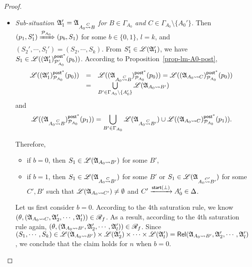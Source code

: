\begin{proof}
{\begin{itemize}
        \item \emph{Sub-situation ${\mathfrak{A} }'_1 = {\mathfrak{A} }_{A_0\stackrel{C}\rightsquigarrow B}$ for $B\in\Gamma_{A_0}$ and $C \in \Gamma_{A_0}\setminus\{A_0'\}$.}
    Then $(p_1,S_1') \xRightarrow{{\mathcal{P} }_{A_0}}(p_b, S_1)$ for some $b\in\{0,1\}$, $l=k$, and $(S_2',\cdots,S_l')=(S_2,\cdots,S_k)$. 
    From  $S'_1 \in {\mathscr{L} }({\mathfrak{A} }'_1)$, we have
    $S_1 \in {\mathscr{L} }(({\mathfrak{A} }_1')^{{\mathsf{post} }^*}_{{\mathcal{P} }'_{A_0}}(p_b))$. 
    According to Proposition~\ref{prop-lm-A0-post},  
    $$
    \begin{array}{l c l}
    {\mathscr{L} }(({\mathfrak{A} }_1')^{{\mathsf{post} }^*}_{{\mathcal{P} }_{A_0}}(p_0)) & = & {\mathscr{L} }(({\mathfrak{A} }_{A_0\stackrel{C}\rightsquigarrow B})^{{\mathsf{post} }^*}_{{\mathcal{P} }_{A_0}}(p_0)) ={\mathscr{L} }(({\mathfrak{A} }_{A_0 \rightsquigarrow C})^{{\mathsf{post} }^*}_{{\mathcal{P} }_{A_0}}(p_0)) \\
    & = & \bigcup\limits_{B' \in \Gamma_{A_0}\setminus\{A_0'\}} {\mathscr{L} }({\mathfrak{A} }_{A_0\rightsquigarrow B'})
    \end{array}
    $$ 
      and  
     $${\mathscr{L} }(({\mathfrak{A} }_{A_0\stackrel{C}\rightsquigarrow B})^{{\mathsf{post} }^*}_{{\mathcal{P} }_{A_0}}(p_1)) = 
    \bigcup\limits_{B'\in\Gamma_{A_0}} {\mathscr{L} }({\mathfrak{A} }_{A_0\stackrel{C}\rightsquigarrow B'}) \cup  {\mathscr{L} }(({\mathfrak{A} }_{A_0 \rightsquigarrow C})^{{\mathsf{post} }^*}_{{\mathcal{P} }_{A_0}}(p_1)).$$
 
 Therefore, 
 \begin{itemize}
	\item if $b = 0$, then  $S_1 \in {\mathscr{L} }({\mathfrak{A} }_{A_0\rightsquigarrow B'})$ for some $B'$,
	\item if $b = 1$, then $S_1 \in {\mathscr{L} }({\mathfrak{A} }_{A_0\stackrel{C}{\rightsquigarrow} B'})$ for some $B'$ or $S_1 \in {\mathscr{L} }({\mathfrak{A} }_{A_0\stackrel{C'}{\rightsquigarrow} B'})$ for some $C', B'$ such that ${\mathscr{L} }({\mathfrak{A} }_{A_0\rightsquigarrow C'}) \neq \emptyset$ and $C' \xrightarrow[]{{\mathsf{start} }(\bot)} A'_0 \in \Delta$.
\end{itemize} 
  
  Let us first consider $b =0$. According to the 4th saturation rule, we know $(\theta, ({\mathfrak{A} }_{A_0\rightsquigarrow C}, {\mathfrak{A} }'_2, \cdots, {\mathfrak{A} }'_l)) \in \mathscr{R}_f$. As a result, according to the 4th saturation rule again, $(\theta, ({\mathfrak{A} }_{A_0\rightsquigarrow B'}, {\mathfrak{A} }'_2, \cdots, {\mathfrak{A} }'_l)) \in \mathscr{R}_f$. Since $(S_1, \cdots, S_k) \in {\mathscr{L} }({\mathfrak{A} }_{A_0 \rightsquigarrow B'}) \times {\mathscr{L} }({\mathfrak{A} }'_2) \times \cdots \times {\mathscr{L} }({\mathfrak{A} }'_l) = \mathsf{Rel}({\mathfrak{A} }_{A_0 \rightsquigarrow B'}, {\mathfrak{A} }'_2, \cdots, {\mathfrak{A} }'_l)$, we conclude that the claim holds for $n$ when $b=0$. 
  

\end{itemize}}
\end{proof}
